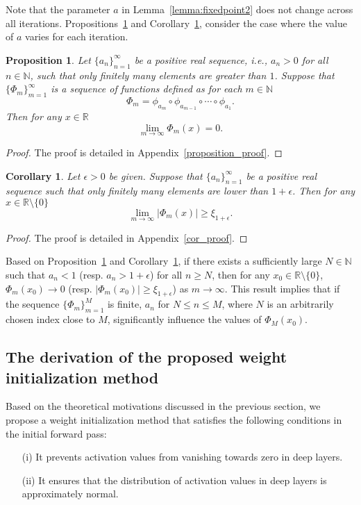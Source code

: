 \documentclass{article} \usepackage{iclr2025_conference,times}
\newtheorem{corollary}[theorem]{Corollary}
\newtheorem{proposition}[theorem]{Proposition}
\begin{document}
Note that the parameter $a$ in Lemma~\ref{lemma:fixedpoint2} does not change across all iterations. Propositions~\ref{prop:fixedpoint3} and Corollary~\ref{cor:fixedpoint4}, consider the case where the value of $a$ varies for each iteration.
\begin{proposition}\label{prop:fixedpoint3}
Let $\{a_n\}_{n=1}^\infty$ be a positive real sequence, i.e., $a_n>0$ for all $n\in \mathbb{N}$, such that only finitely many elements are greater than $1$. 
Suppose that $\{\Phi_m\}_{m=1}^\infty$ is a sequence of functions defined as for each $m\in \mathbb{N}$
$$ \Phi_m = \phi_{a_m} \circ \phi_{a_{m-1}} \circ \cdots \circ \phi_{a_1}.$$
Then for any $x\in \mathbb{R}$ $$
\lim_{m \to \infty} \Phi_m(x) = 0.$$
\end{proposition}
\begin{proof}
The proof is detailed in Appendix~\ref{proposition_proof}.
\end{proof}

\begin{corollary}\label{cor:fixedpoint4}
Let $\epsilon>0$ be given. Suppose that 
$\{a_n\}_{n=1}^\infty$ be a positive real sequence such that only finitely many elements are lower than $1+\epsilon$. Then for any $x\in\mathbb{R}\setminus \{0\}$
$$
\lim_{m \to \infty} \left|\Phi_m(x)\right| \geq \xi_{1+\epsilon}.
$$
\end{corollary}
\begin{proof}
The proof is detailed in Appendix~\ref{cor_proof}.
\end{proof}

Based on Proposition~\ref{prop:fixedpoint3} and Corollary~\ref{cor:fixedpoint4}, if there exists a sufficiently large \( N\in \mathbb{N} \) such that \( a_n<1 \) (resp. \( a_n> 1+\epsilon \)) for all \( n \geq N \), then for any \( x_0 \in \mathbb{R} \setminus \{0\} \), $\Phi_m(x_0)\to 0$ (resp. \( |\Phi_m(x_0)| \geq \xi_{1+\epsilon} \)) as \( m \to \infty \). 
This result implies that if the sequence \( \{\Phi_m\}_{m=1}^M \) is finite, \( a_n \) for \( N \leq n \leq M \), where \( N \) is an arbitrarily chosen index close to \( M \), significantly influence the values of \( \Phi_M(x_0) \).


\subsection{The derivation of the proposed weight initialization method}\label{3.2}
Based on the theoretical motivations discussed in the previous section, we propose a weight initialization method that satisfies the following conditions in the initial forward pass:
\begin{itemize}
    \item[(i)] It prevents activation values from vanishing towards zero in deep layers.
    \item[(ii)] It ensures that the distribution of activation values in deep layers is approximately normal.
\end{itemize}
\end{document}
